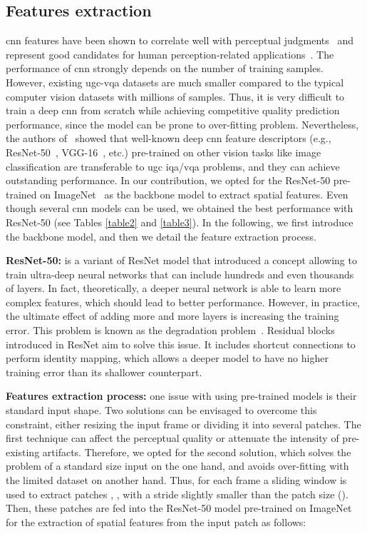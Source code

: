 \documentclass[journal]{IEEEtran}
\begin{document}
\subsection{Features extraction}
\ac{cnn} features have been shown to correlate well with perceptual judgments~\cite{zhang2018unreasonable} and represent good candidates for human perception-related applications~\cite{gao2017deepsim,yang2020deep,amirshahi2016image,johnson2016perceptual,zhang2018unreasonable}. The performance of \ac{cnn} strongly depends on the number of training samples. However, existing \ac{ugc}-\ac{vqa} datasets are much smaller compared to the typical computer vision datasets with millions of samples.
Thus, it is very difficult to train a deep \ac{cnn} from scratch while achieving competitive quality prediction performance, since the model can be prone to over-fitting problem. Nevertheless, the authors of~\cite{tu2021ugc} showed that well-known deep \ac{cnn} feature descriptors (e.g., ResNet-50~\cite{he2016deep}, VGG-16~\cite{zhang2015accelerating}, etc.) pre-trained on other vision tasks like image classification are transferable to \ac{ugc} \ac{iqa}/\ac{vqa} problems, and they can achieve outstanding performance. In our contribution, we opted for the ResNet-50 pre-trained on ImageNet~\cite{deng2009imagenet} as the backbone model to extract spatial features. Even though several \ac{cnn} models can be used, we obtained the best performance with ResNet-50 (see Tables \ref{table2} and \ref{table3}). In the following, we first introduce the backbone model, and then we detail the feature extraction process.

\vspace{1mm}
\textbf{ResNet-50:}  is a variant of ResNet model that introduced a concept allowing to train ultra-deep neural networks that can include hundreds and even thousands of layers. In fact, theoretically, a deeper neural network is able to learn more complex features, which should lead to better performance. However, in practice, the ultimate effect of adding more and more layers is increasing the training error. This problem is known as the degradation problem~\cite{he2016deep}. Residual blocks introduced in ResNet aim to solve this issue. It includes shortcut connections to perform identity mapping, which allows a deeper model to have no higher training error than its shallower counterpart. 

\vspace{1mm}
\textbf{Features extraction process:} one issue with using pre-trained models is their standard input shape. Two solutions can be envisaged to overcome this constraint, either resizing the input frame or dividing it into several patches. The first technique can affect the perceptual quality or attenuate the intensity of pre-existing artifacts. Therefore, we opted for the second solution, which solves the problem of a standard size input on the one hand, and avoids over-fitting with the limited dataset on another hand. Thus, for each frame  a sliding window is used  to extract   patches , \hbox{}, with a stride slightly smaller than the patch size  (). Then, these patches are fed into the ResNet-50 model pre-trained on ImageNet for the extraction of spatial features  from the input patch  as follows: 
\end{document}
